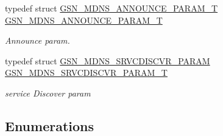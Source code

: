 \begin{DoxyCompactItemize}
typedef struct \hyperlink{a00141}{GSN\_\-MDNS\_\-ANNOUNCE\_\-PARAM\_\-T} \hyperlink{a00668_ga41a672d3bce37ca4fe0d8b08524334a6}{GSN\_\-MDNS\_\-ANNOUNCE\_\-PARAM\_\-T}
\begin{DoxyCompactList}\small\item\em Announce param. \end{DoxyCompactList}\item 
typedef struct \hyperlink{a00148}{GSN\_\-MDNS\_\-SRVCDISCVR\_\-PARAM} \hyperlink{a00668_gae85953b9de0c8db5521e84d7a91149e1}{GSN\_\-MDNS\_\-SRVCDISCVR\_\-PARAM\_\-T}
\begin{DoxyCompactList}\small\item\em service Discover param \end{DoxyCompactList}\end{DoxyCompactItemize}
\subsection*{Enumerations}
